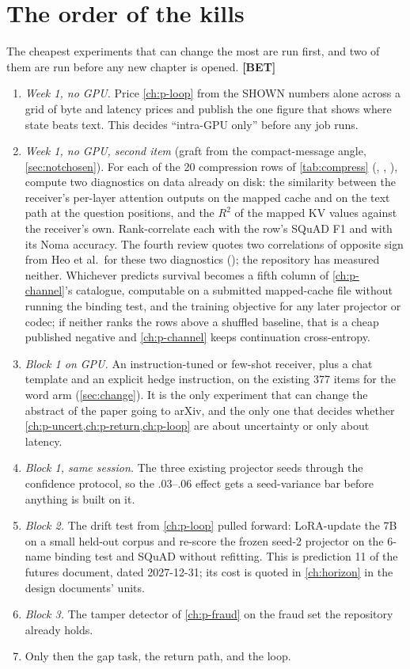 \documentclass[11pt,a4paper]{report}
\newcommand{\BET}{\textcolor{betc}{\textbf{\scriptsize[BET]}}}
\begin{document}
\section{The order of the kills}

The cheapest experiments that can change the most are run first, and two of them are run before any new chapter is opened. \BET

\begin{enumerate}
\item \emph{Week 1, no GPU.} Price \cref{ch:p-loop} from the SHOWN numbers alone across a grid of byte and latency prices and publish the one figure that shows where state beats text. This decides ``intra-GPU only'' before any job runs.
\item \emph{Week 1, no GPU, second item} (graft from the compact-message angle, \cref{sec:notchosen}). For each of the 20 compression rows of \cref{tab:compress} (, , ), compute two diagnostics on data already on disk: the similarity between the receiver's per-layer attention outputs on the mapped cache and on the text path at the question positions, and the $R^2$ of the mapped KV values against the receiver's own. Rank-correlate each with the row's SQuAD F1 and with its Noma accuracy. The fourth review quotes two correlations of opposite sign from Heo et al.\ for these two diagnostics (); the repository has measured neither. Whichever predicts survival becomes a fifth column of \cref{ch:p-channel}'s catalogue, computable on a submitted mapped-cache file without running the binding test, and the training objective for any later projector or codec; if neither ranks the rows above a shuffled baseline, that is a cheap published negative and \cref{ch:p-channel} keeps continuation cross-entropy.
\item \emph{Block 1 on GPU.} An instruction-tuned or few-shot receiver, plus a chat template and an explicit hedge instruction, on the existing 377 items for the word arm (\cref{sec:change}). It is the only experiment that can change the abstract of the paper going to arXiv, and the only one that decides whether \cref{ch:p-uncert,ch:p-return,ch:p-loop} are about uncertainty or only about latency.
\item \emph{Block 1, same session.} The three existing projector seeds through the confidence protocol, so the .03--.06 effect gets a seed-variance bar before anything is built on it.
\item \emph{Block 2.} The drift test from \cref{ch:p-loop} pulled forward: LoRA-update the 7B on a small held-out corpus and re-score the frozen seed-2 projector on the 6-name binding test and SQuAD without refitting. This is prediction 11 of the futures document, dated 2027-12-31; its cost is quoted in \cref{ch:horizon} in the design documents' units.
\item \emph{Block 3.} The tamper detector of \cref{ch:p-fraud} on the fraud set the repository already holds.
\item Only then the gap task, the return path, and the loop.
\end{enumerate}
\end{document}
